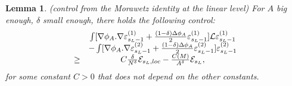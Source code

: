 \documentclass[11pt,a4paper,reqno]{amsart}
\newtheorem{lemma}[theorem]{Lemma}
\theoremstyle{remark}
\numberwithin{equation}{section}
\begin{document}
\begin{lemma}\emph{(control from the Morawetz identity at the linear level)} \label{thetrapped:lem:control du morawetz}
For $A$ big enough, $\delta$ small enough, there holds the following control:
\begin{equation} \label{thetrapped:morawetz:eq:controle lineaire}
\begin{array}{r c l}
&  \int [\nabla \phi_A .\nabla \varepsilon^{(1)}_{s_L-1}+\frac{(1-\delta)\Delta \phi_A}{2}\varepsilon^{(1)}_{s_L-1}] \mathcal{L}\varepsilon^{(1)}_{s_L-1} \\
&-\int [\nabla \phi_A .\nabla \varepsilon^{(2)}_{s_L-1}+\frac{(1-\delta)\Delta \phi_A}{2}\varepsilon^{(2)}_{s_L-1}] \varepsilon^{(2)}_{s_L-1}\\
\geq & C \frac{\delta}{N^{\delta}} \mathcal{E}_{s_L,loc} -\frac{C(M)}{A^{\delta}}\mathcal{E}_{s_L} ,
\end{array}
\end{equation}
for some constant $C>0$ that does not depend on the other constants.

\end{lemma}
\end{document}
